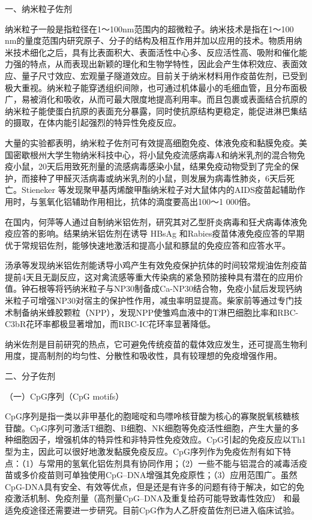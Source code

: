 \begin{center}
    {\large 一、纳米粒子佐剂}
\end{center}

纳米粒子一般是指粒径在1～100nm范围内的超微粒子。纳米技术是指在1～100
nm的量度范围内研究原子、分子的结构及相互作用并加以应用的技术。物质用纳米技术细化之后，具有比表面积大、表面活性中心多、反应活性高、吸附和催化能力强的特点，从而表现出新颖的理化和生物学特性，因此会产生体积效应、表面效应、量子尺寸效应、宏观量子隧道效应。目前关于纳米材料用作疫苗佐剂，已受到极大重视。纳米粒子能穿透组织间隙，也可通过机体最小的毛细血管，且分布面极广，易被消化和吸收，从而可最大限度地提高利用率。而且包裹或表面结合抗原的纳米粒子能使蛋白抗原的表面充分暴露，同时使抗原结构更稳定，能促进淋巴集结的摄取，在体内能引起强烈的特异性免疫反应。

大量的实验都表明，纳米粒子佐剂可有效提高细胞免疫、体液免疫和黏膜免疫。美国密歇根州大学生物纳米科技中心，将小鼠免疫流感病毒A和纳米乳剂的混合物免疫小鼠，20天后用致死剂量的流感病毒感染小鼠，结果免疫动物受到了完全的保护，而接种了甲醛灭活病毒或纳米乳剂的小鼠，则发展为病毒性肺炎，6天后死亡。Stieneker
等发现聚甲基丙烯酸甲酯纳米粒子对大鼠体内的AIDS疫苗起辅助作用时，与氢氧化铝辅助作用相比，抗体的滴度要高出100～1
000倍。

在国内，何萍等人通过自制纳米铝佐剂，研究其对乙型肝炎病毒和狂犬病毒体液免疫应答的影响。结果纳米铝佐剂在诱导
HBsAg
和Rabies疫苗体液免疫应答的早期优于常规铝佐剂，能够快速地激活和提高小鼠和豚鼠的免疫应答和应答水平。

汤承等发现纳米铝佐剂能诱导小鸡产生有效免疫保护抗体的时间较常规油佐剂疫苗提前4天且无副反应，这对禽流感等重大传染病的紧急预防接种具有潜在的应用价值。钟石根等将钙纳米粒子与NP30制备成Ca-NP30结合物，免疫小鼠后发现钙纳米粒子可增强NP30对宿主的保护性作用，减虫率明显提高。柴家前等通过专门技术制备纳米蜂胶颗粒（NPP），发现NPP使雏鸡血液中的T淋巴细胞比率和RBC-C3bR花环率都极显著增加，而RBC-IC花环率显著降低。

纳米佐剂是目前研究的热点，它可避免传统疫苗的载体效应发生，还可提高生物利用度，提高制剂的均匀性、分散性和吸收性，具有较理想的免疫增强作用。

\begin{center}
    {\large 二、分子佐剂}
\end{center}

（一）CpG序列（CpG motifs）

CpG序列是指一类以非甲基化的胞嘧啶和鸟嘌呤核苷酸为核心的寡聚脱氧核糖核苷酸。CpG序列可激活T细胞、B细胞、NK细胞等免疫活性细胞，产生大量的多种细胞因子，增强机体的特异性和非特异性免疫效应。CpG引起的免疫反应以Th1型为主，因此可以很好地激发黏膜免疫反应。CpG序列作为免疫佐剂有如下特点：（1）与常用的氢氧化铝佐剂具有协同作用；（2）一些不能与铝混合的减毒活疫苗或多价疫苗则可单独使用CpG--DNA增强其免疫原性；（3）应用范围广。虽然CpG-DNA具有安全、有效等优点，但是还是有许多的问题有待于解决，如它的免疫激活机制、免疫剂量（高剂量CpG--DNA及重复给药可能导致毒性效应）
和最适免疫途径还需要进一步研究。目前CpG作为人乙肝疫苗佐剂已进入临床试验。

